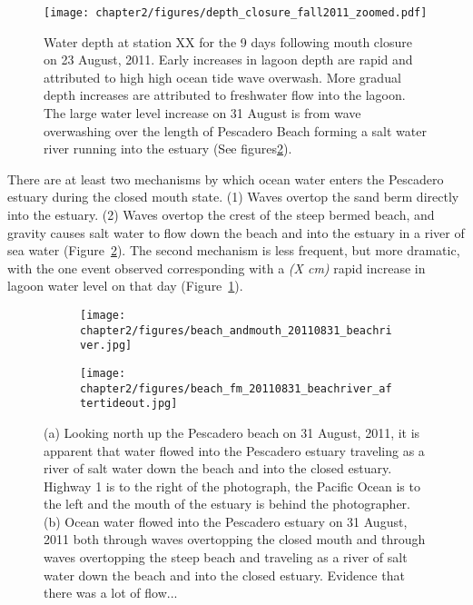 \begin{figure}
\centering
		\texttt{[image: chapter2/figures/depth\_closure\_fall2011\_zoomed.pdf]} \caption{Water depth at station XX for the 9 days following mouth closure on 23 August, 2011. Early increases in lagoon depth are rapid and attributed to high high ocean tide wave overwash. More gradual depth increases are attributed to freshwater flow into the lagoon. The large water level increase on 31 August is from wave overwashing over the length of Pescadero Beach forming a salt water river running into the estuary (See figures\ref{fig:beachriver}).}
	\label{fig:depthclosuref11} 
\end{figure}


There are at least two mechanisms by which ocean water enters the Pescadero estuary during the closed mouth state. (1) Waves overtop the sand berm directly into the estuary. (2) Waves overtop the crest of the steep bermed beach, and gravity causes salt water to flow down the beach and into the estuary in a river of sea water (Figure~\ref{fig:beachriver}). The second mechanism is less frequent, but more dramatic, with the one event observed corresponding with a \emph{(X cm)} rapid increase in lagoon water level on that day (Figure~\ref{fig:depthclosuref11}).

\begin{figure}
\begin{subfigure}{.5\textwidth}
		\texttt{[image: chapter2/figures/beach\_andmouth\_20110831\_beachriver.jpg]} \caption{}
\end{subfigure}
\begin{subfigure}{.5\textwidth}
		\texttt{[image: chapter2/figures/beach\_fm\_20110831\_beachriver\_aftertideout.jpg]}
\end{subfigure}   \caption{(a) Looking north up the Pescadero beach on 31 August, 2011, it is apparent that water flowed into the Pescadero estuary traveling as a river of salt water down the beach and into the closed estuary. Highway 1 is to the right of the photograph, the Pacific Ocean is to the left and the mouth of the estuary is behind the photographer. (b) Ocean water flowed into the Pescadero estuary on 31 August, 2011 both through waves overtopping the closed mouth and through waves overtopping the steep beach and traveling as a river of salt water down the beach and into the closed estuary. Evidence that there was a lot of flow...} 		 \label{fig:beachriver} 
 \end{figure}

